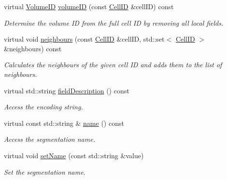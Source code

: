 \begin{DoxyCompactItemize}
virtual \hyperlink{namespace_d_d4hep_1_1_d_d_segmentation_a61a6833a18d1800bdef176595f83e3ba}{VolumeID} \hyperlink{class_d_d4hep_1_1_d_d_segmentation_1_1_segmentation_a00b309f8094c1831dcd32317959d5071}{volumeID} (const \hyperlink{namespace_d_d4hep_1_1_d_d_segmentation_ac7af071d85cb48820914434a07e21ba1}{CellID} \&cellID) const 
\begin{DoxyCompactList}\small\item\em Determine the volume ID from the full cell ID by removing all local fields. \item\end{DoxyCompactList}\item 
virtual void \hyperlink{class_d_d4hep_1_1_d_d_segmentation_1_1_segmentation_af91b751e26aed9cf2a2e80d2b74c0544}{neighbours} (const \hyperlink{namespace_d_d4hep_1_1_d_d_segmentation_ac7af071d85cb48820914434a07e21ba1}{CellID} \&cellID, std::set$<$ \hyperlink{namespace_d_d4hep_1_1_d_d_segmentation_ac7af071d85cb48820914434a07e21ba1}{CellID} $>$ \&neighbours) const 
\begin{DoxyCompactList}\small\item\em Calculates the neighbours of the given cell ID and adds them to the list of neighbours. \item\end{DoxyCompactList}\item 
virtual std::string \hyperlink{class_d_d4hep_1_1_d_d_segmentation_1_1_segmentation_ad22779a42ab1bacc7464c191322cb5d2}{fieldDescription} () const 
\begin{DoxyCompactList}\small\item\em Access the encoding string. \item\end{DoxyCompactList}\item 
virtual const std::string \& \hyperlink{class_d_d4hep_1_1_d_d_segmentation_1_1_segmentation_a66085df678437a2cd3baeeded8580086}{name} () const 
\begin{DoxyCompactList}\small\item\em Access the segmentation name. \item\end{DoxyCompactList}\item 
virtual void \hyperlink{class_d_d4hep_1_1_d_d_segmentation_1_1_segmentation_a9bfa16e70ac68d6013c49be45b3438c3}{setName} (const std::string \&value)
\begin{DoxyCompactList}\small\item\em Set the segmentation name. \item\end{DoxyCompactList}\item 

\end{DoxyCompactItemize}
